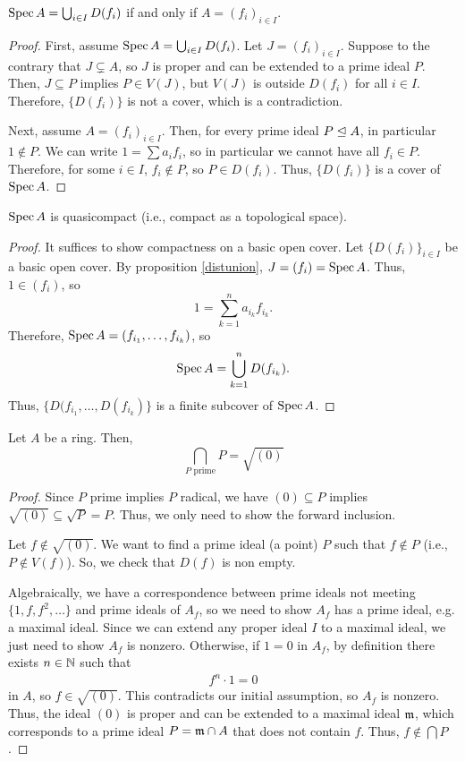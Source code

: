 \documentclass[12pt]{article}
\begin{document}
\begin{prop}\label{distunion}
    $\operatorname{Spec} A = \bigcup_{i\in I} D(f_i)$ if and only if $A=(f_i)_{i\in I}$.
\end{prop}

\begin{proof}
    First, assume $\operatorname{Spec} A = \bigcup_{i\in I} D(f_i)$. Let $J=(f_i)_{i\in I}$. Suppose to the contrary that $J\subsetneq A$, so $J$ is proper and can be extended to a prime ideal $P$. Then, $J\subseteq P$ implies $P\in V(J)$, but $V(J)$ is outside $D(f_i)$ for all $i\in I$. Therefore, $\{D(f_i)\}$ is not a cover, which is a contradiction.
    
    Next, assume $A=(f_i)_{i\in I}$. Then, for every prime ideal $P\trianglelefteq A$, in particular $1\not\in P$. We can write $1=\sum a_i f_i$, so in particular we cannot have all $f_i\in P$. Therefore, for some $i\in I$, $f_i\not\in P$, so $P\in D(f_i)$. Thus, $\{D(f_i)\}$ is a cover of $\operatorname{Spec} A$.
\end{proof}

\begin{prop}
    $\operatorname{Spec} A$ is quasicompact (i.e., compact as a topological space).
\end{prop}

\begin{proof}
    It suffices to show compactness on a basic open cover. Let $\{D(f_i)\}_{i\in I}$ be a basic open cover. By proposition \ref{distunion}, $J=(f_i)=\operatorname{Spec} A$. Thus, $1\in (f_i)$, so
    \[1 = \sum_{k=1}^n a_{i_k} f_{i_k}.\]
    Therefore, $\operatorname{Spec} A = (f_{i_1},\dots,f_{i_k})$, so
    \[\operatorname{Spec} A = \bigcup_{k=1}^n D(f_{i_k}).\]
    Thus, $\{D(f_{i_1},\dots,D(f_{i_k})\}$ is a finite subcover of $\operatorname{Spec} A$.
\end{proof}

\begin{prop}
    Let $A$ be a ring. Then,
    \[\bigcap_{P \text{ prime}} P = \sqrt{(0)}\]
\end{prop}

\begin{proof}
    Since $P$ prime implies $P$ radical, we have $(0)\subseteq P$ implies $\sqrt{(0)}\subseteq \sqrt{P} = P$. Thus, we only need to show the forward inclusion.
    
    Let $f\not\in \sqrt{(0)}$. We want to find a prime ideal (a point) $P$ such that $f\not\in P$ (i.e., $P\not\in V(f)$). So, we check that $D(f)$ is non empty.
    
    Algebraically, we have a correspondence between prime ideals not meeting $\{1,f,f^2,\dots\}$ and prime ideals of $A_f$, so we need to show $A_f$ has a prime ideal, e.g. a maximal ideal. Since we can extend any proper ideal $I$ to a maximal ideal, we just need to show $A_f$ is nonzero. Otherwise, if $1=0$ in $A_f$, by definition there exists $n\in \mathbb{N}$ such that
    \begin{align*}
        f^n\cdot 1 = 0
    \end{align*}
    in $A$, so $f\in \sqrt{(0)}$. This contradicts our initial assumption, so $A_f$ is nonzero. Thus, the ideal $(0)$ is proper and can be extended to a maximal ideal $\mathfrak{m}$, which corresponds to a prime ideal $P=\mathfrak{m} \cap A$ that does not contain $f$. Thus, $f\not\in \bigcap P$.
\end{proof}
\end{document}
